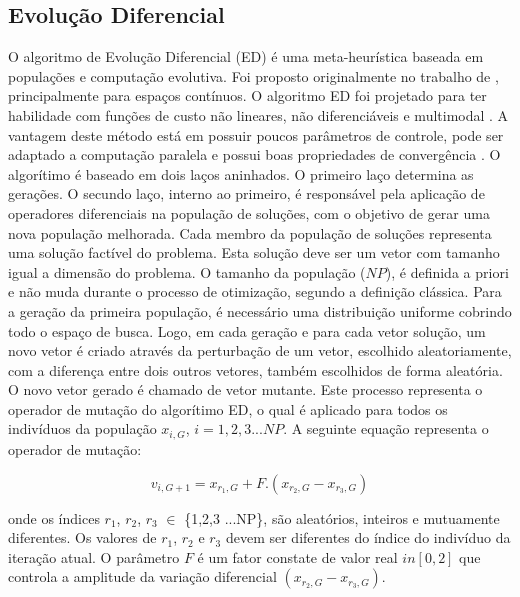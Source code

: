 \documentclass[12pt,A4,A4pt]{article}
\begin{document}


\subsection{Evolução Diferencial}
\label{ed}
\hspace{0.5cm}O algoritmo de Evolução Diferencial (ED) é uma meta-heurística baseada em populações e computação evolutiva. Foi proposto originalmente no trabalho de , principalmente para espaços contínuos. O algoritmo ED foi projetado para ter habilidade com funções de custo não lineares, não diferenciáveis e multimodal \cite{Storn1997}. A vantagem deste método está em possuir poucos parâmetros de controle, pode ser adaptado a computação paralela e possui boas propriedades de convergência \cite{Storn1997}. O algorítimo é baseado em dois laços aninhados. O primeiro laço determina as gerações. O secundo laço, interno ao primeiro, é responsável pela aplicação de operadores diferenciais na população de soluções, com o objetivo de gerar uma nova população melhorada. Cada membro da população de soluções representa uma solução factível do problema. Esta solução deve ser um vetor com tamanho igual a dimensão do problema. O tamanho da população ($NP$), é definida a priori e não muda durante o processo de otimização, segundo a definição clássica. Para a geração da primeira população, é necessário uma distribuição uniforme cobrindo todo o espaço de busca. Logo, em cada geração e para cada vetor solução, um novo vetor é criado através da perturbação de um vetor, escolhido aleatoriamente, com a diferença entre dois outros vetores, também escolhidos de forma aleatória. O novo vetor gerado é chamado de vetor mutante. Este processo representa o operador de mutação do algorítimo ED, o qual é aplicado para todos os indivíduos da população $x_{i,G}$, $i = 1,2,3...NP$. A seguinte equação representa o operador de mutação:

\begin{equation}
v_{i,G+1} = x_{r_{1},G} + F . (x_{r_{2},G} - x_{r_{3},G}) \label{trial}
\end{equation}

onde os índices $r_{1}$, $r_{2}$, $r_{3}$ $\in$ \{1,2,3 ...NP\}, são aleatórios, inteiros e mutuamente diferentes. Os valores de $r_{1}$, $r_{2}$ e $r_{3}$ devem ser diferentes do índice do indivíduo da iteração atual. O parâmetro $F$ é um fator constate de valor real $in [0,2]$ que controla a amplitude da variação diferencial $(x_{r_{2},G} - x_{r_{3},G})$.
\end{document}
